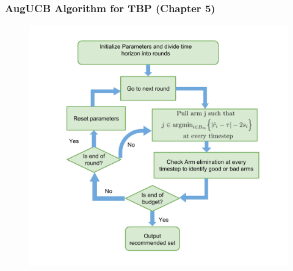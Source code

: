 \begin{frame}
\frametitle{AugUCB Algorithm for TBP {(Chapter 5)}}
\begin{figure}
\includegraphics[scale=0.24]{img/AugUCB_flow.png}
\end{figure}
\end{frame}



